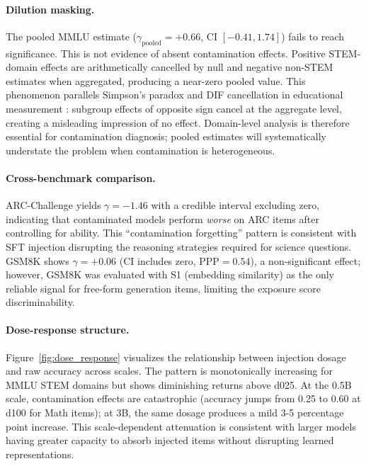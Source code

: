 \paragraph{Dilution masking.}
The pooled MMLU estimate ($\gamma_{\text{pooled}} = +0.66$, CI $[-0.41, 1.74]$) fails to reach significance. This is not evidence of absent contamination effects. Positive STEM-domain effects are arithmetically cancelled by null and negative non-STEM estimates when aggregated, producing a near-zero pooled value. This phenomenon parallels Simpson's paradox \citep{kievit_2013_simpsons_paradox} and DIF cancellation in educational measurement \citep{ercikan_2008_dif_cancellation}: subgroup effects of opposite sign cancel at the aggregate level, creating a misleading impression of no effect. Domain-level analysis is therefore essential for contamination diagnosis; pooled estimates will systematically understate the problem when contamination is heterogeneous.

\paragraph{Cross-benchmark comparison.}
ARC-Challenge yields $\gamma = -1.46$ with a credible interval excluding zero, indicating that contaminated models perform \textit{worse} on ARC items after controlling for ability. This ``contamination forgetting'' pattern is consistent with SFT injection disrupting the reasoning strategies required for science questions. GSM8K shows $\gamma = +0.06$ (CI includes zero, PPP$=0.54$), a non-significant effect; however, GSM8K was evaluated with S1 (embedding similarity) as the only reliable signal for free-form generation items, limiting the exposure score discriminability.

\paragraph{Dose-response structure.}
Figure~\ref{fig:dose_response} visualizes the relationship between injection dosage and raw accuracy across scales. The pattern is monotonically increasing for MMLU STEM domains but shows diminishing returns above d025. At the 0.5B scale, contamination effects are catastrophic (accuracy jumps from 0.25 to 0.60 at d100 for Math items); at 3B, the same dosage produces a mild 3-5 percentage point increase. This scale-dependent attenuation is consistent with larger models having greater capacity to absorb injected items without disrupting learned representations.

